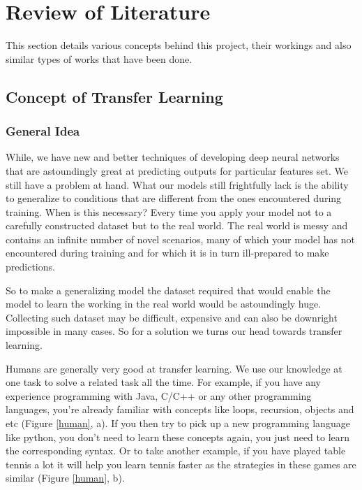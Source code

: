 \documentclass[a4paper, 12pt]{article}
\begin{document}
\begin{sloppypar}
\section {Review of Literature}

This section details various concepts behind this project, their workings and also similar types of works that have been done.

\subsection{Concept of Transfer Learning}

\subsubsection{General Idea}
While, we have new and better techniques of developing deep neural networks that are astoundingly great at predicting outputs for particular features set. We still have a problem at hand. What our models still frightfully lack is the ability to generalize to conditions that are different from the ones encountered during training. When is this necessary? Every time you apply your model not to a carefully constructed dataset but to the real world. The real world is messy and contains an infinite number of novel scenarios, many of which your model has not encountered during training and for which it is in turn ill-prepared to make predictions. %

So to make a generalizing model the dataset required that would enable the model to learn the working in the real world would be astoundingly huge. Collecting such dataset may be difficult, expensive and can also be downright impossible in many cases. So for a solution we turns our head towards transfer learning.

Humans are generally very good at transfer learning. We use our knowledge at one task to solve a related task all the time. For example, if you have any experience programming with Java, C/C++ or any other programming languages, you’re already familiar with concepts like loops, recursion, objects and etc (Figure \ref{human}, a). If you then try to pick up a new programming language like python, you don’t need to learn these concepts again, you just need to learn the corresponding syntax. Or to take another example, if you have played table tennis a lot it will help you learn tennis faster as the strategies in these games are similar (Figure \ref{human}, b). %


\end{sloppypar}
\end{document}
